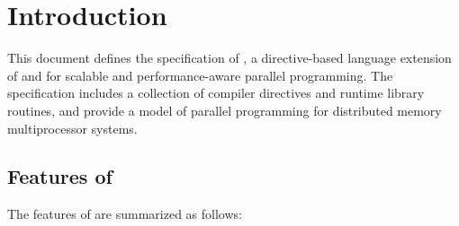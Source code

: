 
\setvruler[][][][3][0]
\chapter{Introduction}
\setcounter{page}{1}

This document defines the specification of {\XMP}, a directive-based
language extension of {\C} and {\Fort} for scalable and
performance-aware parallel programming.
%
The specification includes a collection of compiler directives and
runtime library routines, and provide a model of parallel programming
for distributed memory multiprocessor systems.


\section{Features of {\XMP}}

The features of {\XMP} are summarized as follows:


